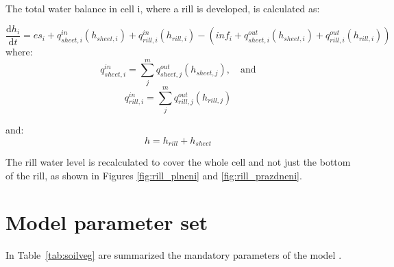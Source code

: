 The total water balance in cell i, where a rill is developed, is calculated as:

\begin{equation}
    \frac{\mathrm{d}h_i}{\mathrm{d}t} = es_i + q^{in}_{sheet,i}(h_{sheet,i})
    +q^{in}_{rill,i}(h_{rill,i}) - (inf_i + q^{out}_{sheet,i}(h_{sheet,i}) +
    q^{out}_{rill,i}(h_{rill,i}))
\end{equation}
where:
\begin{equation}
    q^{in}_{sheet,i} = \sum_j^m q^{out}_{sheet, j}(h_{sheet,j}),\quad \mathrm{and}
\end{equation}
\begin{equation}
    q^{in}_{rill,i} = \sum_j^m q^{out}_{rill, j}(h_{rill,j})
\end{equation}

and:
\begin{equation}
   h = h_{rill} + h_{sheet}  
\end{equation}

The rill water level is recalculated to cover the whole cell and not just the
bottom of the rill, as shown in Figures \ref{fig:rill_plneni} and
\ref{fig:rill_prazdneni}.


\section{Model parameter set}
In Table~\ref{tab:soilveg} are summarized the mandatory parameters of the model \smod.

%
%

%
